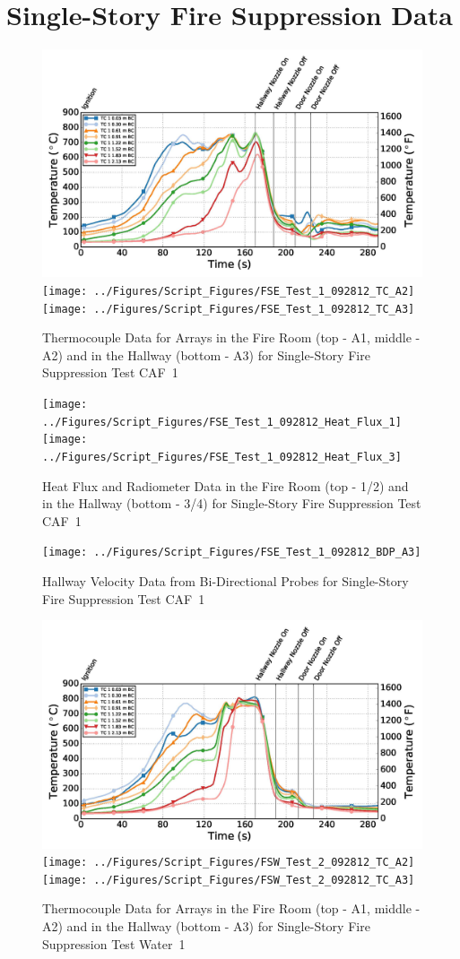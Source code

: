 \documentclass[12pt,oneside]{book}
\begin{document}
\chapter{Single-Story Fire Suppression Data}
\label{app:fire_suppression}
\newpage

\begin{figure}[ht]
\includegraphics[width=.725\columnwidth]{../Figures/Script_Figures/FSE_Test_1_092812_TC_A1}
\texttt{[image: ../Figures/Script\_Figures/FSE\_Test\_1\_092812\_TC\_A2]}
\texttt{[image: ../Figures/Script\_Figures/FSE\_Test\_1\_092812\_TC\_A3]}
\caption{Thermocouple Data for Arrays in the Fire Room (top - A1, middle - A2) and in the Hallway (bottom - A3) for Single-Story Fire Suppression Test CAF~1}
\end{figure}


\begin{figure}[ht]
\texttt{[image: ../Figures/Script\_Figures/FSE\_Test\_1\_092812\_Heat\_Flux\_1]}
\texttt{[image: ../Figures/Script\_Figures/FSE\_Test\_1\_092812\_Heat\_Flux\_3]}
\caption{Heat Flux and Radiometer Data in the Fire Room (top - 1/2) and in the Hallway (bottom - 3/4) for Single-Story Fire Suppression Test CAF~1}
\end{figure}

\begin{figure}[ht]
\texttt{[image: ../Figures/Script\_Figures/FSE\_Test\_1\_092812\_BDP\_A3]}
\caption{Hallway Velocity Data from Bi-Directional Probes for Single-Story Fire Suppression Test CAF~1}
\end{figure}

\begin{figure}[ht]
\includegraphics[width=.725\columnwidth]{../Figures/Script_Figures/FSW_Test_2_092812_TC_A1}
\texttt{[image: ../Figures/Script\_Figures/FSW\_Test\_2\_092812\_TC\_A2]}
\texttt{[image: ../Figures/Script\_Figures/FSW\_Test\_2\_092812\_TC\_A3]}
\caption{Thermocouple Data for Arrays in the Fire Room (top - A1, middle - A2) and in the Hallway (bottom - A3) for Single-Story Fire Suppression Test Water~1}
\end{figure}
\end{document}
